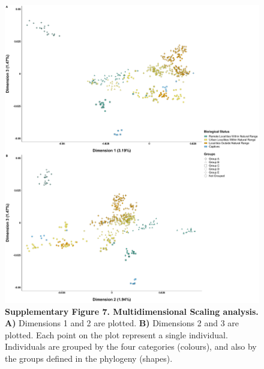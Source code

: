 \documentclass[twoside, british, a4paper]{article}
\begin{document}
\begin{figure}
\centering
\includegraphics[width=1\textwidth]{../FPG--Pipeline/FPG--Plots/FPG--MDS/FPG--MDS_SI.pdf}
\captionsetup{labelformat=empty}
\caption[Supplementary Figure 7. Multidimensional Scaling analysis.]{\textbf{Supplementary Figure 7. Multidimensional Scaling analysis.} \textbf{A)} Dimensions 1 and 2 are plotted. \textbf{B)} Dimensions 2 and 3 are plotted. Each point on the plot represent a single individual. Individuals are grouped by the four categories (colours), and also by the groups defined in the phylogeny (shapes).}
\label{MainText:FPG--MDS_SI}
\end{figure}
\end{document}

